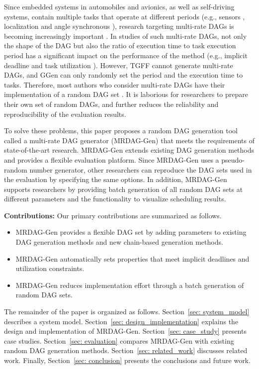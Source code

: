 Since embedded systems in automobiles and avionics, as well as self-driving systems, contain multiple tasks that operate at different periods (e.g., sensors \cite{guanindustry}, localization \cite{verucchi2020latency} and angle synchronous \cite{hamann2017communication}), research targeting multi-rate DAGs is becoming increasingly important \cite{gunzel2021suspension, kordon2020evaluation}.
In studies of such multi-rate DAGs, not only the shape of the DAG but also the ratio of execution time to task execution period has a significant impact on the performance of the method (e.g., implicit deadline \cite{ueter2021hard, cho2021conditionally} and task utilization \cite{nogd2020response, yang2020mixed}).
However, TGFF cannot generate multi-rate DAGs, and GGen can only randomly set the period and the execution time to tasks.
Therefore, most authors who consider multi-rate DAGs have their implementation of a random DAG set \cite{voronov2021ai, dong2019efficient, yang2020mixed, nogd2020response}.
It is laborious for researchers to prepare their own set of random DAGs, and further reduces the reliability and reproducibility of the evaluation results.

To solve these problems, this paper proposes a random DAG generation tool called a multi-rate DAG generator (MRDAG-Gen) that meets the requirements of state-of-the-art research.
MRDAG-Gen extends existing DAG generation methods and provides a flexible evaluation platform.
Since MRDAG-Gen uses a pseudo-random number generator, other researchers can reproduce the DAG sets used in the evaluation by specifying the same options.
In addition, MRDAG-Gen supports researchers by providing batch generation of all random DAG sets at different parameters and the functionality to visualize scheduling results.

\textbf{Contributions: } Our primary contributions are summarized as follows.
\begin{itemize}
    \item MRDAG-Gen provides a flexible DAG set by adding parameters to existing DAG generation methods and new chain-based generation methods.
    \item MRDAG-Gen automatically sets properties that meet implicit deadlines and utilization constraints.
    \item MRDAG-Gen reduces implementation effort through a batch generation of random DAG sets.
\end{itemize}

The remainder of the paper is organized as follows.
Section~\ref{sec: system_model} describes a system model.
Section~\ref{sec: design_implementation} explains the design and implementation of MRDAG-Gen.
Section~\ref{sec: case_study} presents case studies.
Section~\ref{sec: evaluation} compares MRDAG-Gen with existing random DAG generation methods.
Section~\ref{sec: related_work} discusses related work.
Finally, Section~\ref{sec: conclusion} presents the conclusions and future work.
